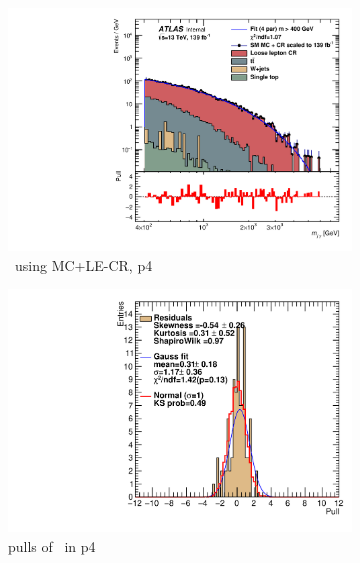 \newpage

\begin{figure}[ht]
    \centering
    \begin{subfigure}[h]{0.38\linewidth}
    \includegraphics[scale=0.3]{figs/ch6/fit/variable_nosmooth/p4/1PB/output_SMMCplusCR_Mjg_p4.pdf}%
    \caption{\mjph \ using MC+LE-CR, p4}
    \end{subfigure}
    \hfill
    \begin{subfigure}[h]{0.4\linewidth}
    \includegraphics[scale=0.32]{figs/ch6/fit/variable_nosmooth/p4/1PB/pull_SMMCplusCR_Mjg_p4.pdf}%
    \caption{pulls of \mjph \ in p4}
    \end{subfigure}
    \hfill
    \begin{subfigure}[h]{0.38\linewidth}

\end{subfigure}
\end{figure}
